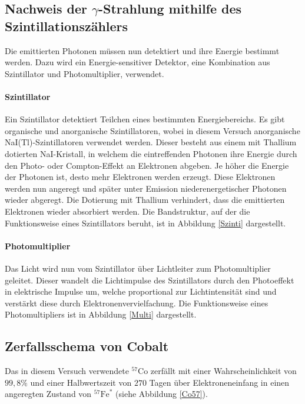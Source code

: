  \subsection{Nachweis der $\gamma$-Strahlung mithilfe des Szintillationszählers}
 Die emittierten Photonen müssen nun detektiert und ihre Energie bestimmt werden. Dazu wird ein Energie-sensitiver Detektor, eine Kombination aus Szintillator und Photomultiplier, verwendet.
 \paragraph{Szintillator} Ein Szintillator detektiert Teilchen eines bestimmten Energiebereichs. Es gibt organische und anorganische Szintillatoren, wobei in diesem Versuch anorganische NaI(Tl)-Szintillatoren verwendet werden. Dieser besteht aus einem mit Thallium dotierten NaI-Kristall, in welchem die eintreffenden Photonen ihre Energie durch den Photo- oder Compton-Effekt an Elektronen abgeben. Je höher die Energie der Photonen ist, desto mehr Elektronen werden erzeugt. Diese Elektronen werden nun angeregt und später unter Emission  niederenergetischer Photonen wieder abgeregt. Die Dotierung mit Thallium verhindert, dass die emittierten Elektronen wieder absorbiert werden. Die Bandstruktur, auf der die Funktionsweise eines Szintillators beruht, ist in Abbildung \ref{Szinti} dargestellt.\cite{szinti}
 
 \paragraph{Photomultiplier}
 Das Licht wird nun vom Szintillator über Lichtleiter zum Photomultiplier geleitet. Dieser wandelt die Lichtimpulse des Szintillators durch den Photoeffekt in elektrische Impulse um, welche proportional zur Lichtintensität sind und verstärkt diese durch Elektronenvervielfachung. Die Funktionsweise eines Photomultipliers ist in Abbildung \ref{Multi} dargestellt.\cite{PM}
 

\subsection{Zerfallsschema von Cobalt}

Das in diesem Versuch verwendete $^{57}$Co zerfällt mit einer Wahrscheinlichkeit von $99,8\%$ und einer Halbwertszeit von $270$ Tagen über Elektroneneinfang in einen angeregten Zustand von $^{57}\mathrm{Fe}^*$ (siehe Abbildung \ref{Co57}).


